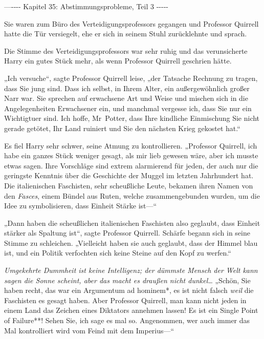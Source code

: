 

\hypertarget{abstimmungsprobleme-teil-3}{%

—\/-\/-\/-\/- Kapitel 35: Abstimmungsprobleme, Teil 3 -\/-\/-\/-\/-

Sie waren zum Büro des Verteidigungsprofessors gegangen und Professor Quirrell hatte die Tür versiegelt, ehe er sich in seinem Stuhl zurücklehnte und sprach.

Die Stimme des Verteidigungsprofessors war sehr ruhig und das verunsicherte Harry ein gutes Stück mehr, als wenn Professor Quirrell geschrien hätte.

„Ich versuche“, sagte Professor Quirrell leise, „der Tatsache Rechnung zu tragen, dass Sie jung sind. Dass ich selbst, in Ihrem Alter, ein außergewöhnlich großer Narr war. Sie sprechen auf erwachsene Art und Weise und mischen sich in die Angelegenheiten Erwachsener ein, und manchmal vergesse ich, dass Sie nur ein Wichtigtuer sind. Ich hoffe, Mr~Potter, dass Ihre kindliche Einmischung Sie nicht gerade getötet, Ihr Land ruiniert und Sie den nächsten Krieg gekostet hat.“

Es fiel Harry sehr schwer, seine Atmung zu kontrollieren. „Professor Quirrell, ich habe ein ganzes Stück weniger gesagt, als mir lieb gewesen wäre, aber ich musste etwas sagen. Ihre Vorschläge sind extrem alarmierend für jeden, der auch nur die geringste Kenntnis über die Geschichte der Muggel im letzten Jahrhundert hat. Die italienischen Faschisten, sehr scheußliche Leute, bekamen ihren Namen von den \emph{Fasces}, einem Bündel aus Ruten, welche zusammengebunden wurden, um die Idee zu symbolisieren, dass Einheit Stärke ist—“

„Dann haben die scheußlichen italienischen Faschisten also geglaubt, dass Einheit stärker als Spaltung ist“, sagte Professor Quirrell. Schärfe begann sich in seine Stimme zu schleichen. „Vielleicht haben sie auch geglaubt, dass der Himmel blau ist, und ein Politik verfochten sich keine Steine auf den Kopf zu werfen.“

\emph{Umgekehrte Dummheit ist keine Intelligenz; der dümmste Mensch der Welt kann sagen die Sonne scheint, aber das macht es draußen nicht dunkel…} „Schön, Sie haben recht, das war ein Argumentum ad hominem*, es ist nicht falsch \emph{weil} die Faschisten es gesagt haben. Aber Professor Quirrell, man kann nicht jeden in einem Land das Zeichen eines Diktators annehmen lassen! Es ist ein Single Point of Failure**! Sehen Sie, ich sage es mal so. Angenommen, wer auch immer das Mal kontrolliert wird vom Feind mit dem Imperius—“

}
